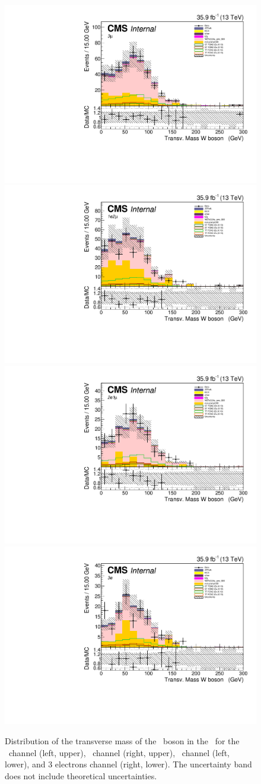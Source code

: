 \begin{figure}[htbp]
	\centering
	\includegraphics[width=0.49\linewidth]{6_Search/Figures/InitialFit/vars/wzcontrol_MVA_mWt_uuu_Stack}
	\includegraphics[width=0.49\linewidth]{6_Search/Figures/InitialFit/vars/wzcontrol_MVA_mWt_uue_Stack}
	\includegraphics[width=0.49\linewidth]{6_Search/Figures/InitialFit/vars/wzcontrol_MVA_mWt_eeu_Stack}
	\includegraphics[width=0.49\linewidth]{6_Search/Figures/InitialFit/vars/wzcontrol_MVA_mWt_eee_Stack}
	\caption{Distribution of the transverse mass of the \PW\ boson in the \WZCR\ for the \mumumu\ channel (left, upper), \emumu\ channel (right, upper), \eemu\ channel (left, lower), and 3 electrons channel (right, lower). The uncertainty band does not include theoretical uncertainties.}
	\label{fig:mtwstack}
\end{figure}


